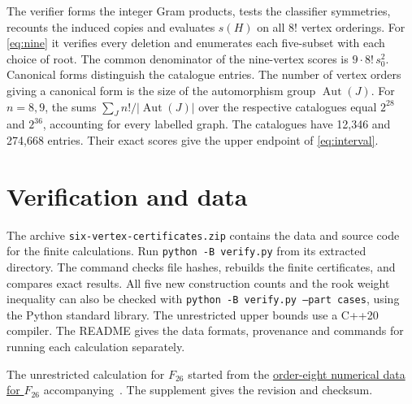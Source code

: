 \documentclass[11pt,a4paper]{article}
\DeclareMathOperator{\Aut}{Aut}
\begin{document}
The verifier forms the integer Gram products, tests the classifier symmetries, recounts the induced copies and evaluates \(s(H)\) on all \(8!\) vertex orderings. For \eqref{eq:nine} it verifies every deletion and enumerates each five-subset with each choice of root. The common denominator of the nine-vertex scores is \(9\cdot8!\,s_0^2\). Canonical forms distinguish the catalogue entries. The number of vertex orders giving a canonical form is the size of the automorphism group \(\Aut(J)\). For \(n=8,9\), the sums \(\sum_J n!/|\Aut(J)|\) over the respective catalogues equal \(2^{28}\) and \(2^{36}\), accounting for every labelled graph. The catalogues have 12,346 and 274,668 entries. Their exact scores give the upper endpoint of \eqref{eq:interval}.



\clearpage
\section*{Verification and data}
The archive \texttt{six-vertex-certificates.zip} contains the data and
source code for the finite calculations. Run \texttt{python -B verify.py}
from its extracted directory. The command checks file hashes, rebuilds
the finite certificates, and compares exact results. All five new
construction counts and the rook weight inequality can also be checked
with \texttt{python -B verify.py --part cases}, using the Python
standard library. The unrestricted upper bounds use a C++20 compiler.
The README gives the data formats, provenance and commands for running
each calculation separately.

The unrestricted calculation for \(F_{26}\) started from the \href{https://github.com/bodnalev/supplementary_files/blob/9f356bb3dc10dcacd4d26a4eb1d556c2650e4e1b/graph_inducibility_6vtx/certs/inexact_26.pickle}{order-eight numerical data for \(F_{26}\)} accompanying~\cite{six}. The supplement gives the revision and checksum.
\end{document}
